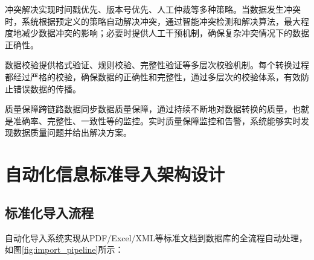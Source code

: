 冲突解决实现时间戳优先、版本号优先、人工仲裁等多种策略。当数据发生冲突时，系统根据预定义的策略自动解决冲突，通过智能冲突检测和解决算法，最大程度地减少数据冲突的影响；必要时提供人工干预机制，确保复杂冲突情况下的数据正确性。

数据校验提供格式验证、规则校验、完整性验证等多层次校验机制。每个转换过程都经过严格的校验，确保数据的正确性和完整性，通过多层次的校验体系，有效防止错误数据的传播。

质量保障跨链路数据同步数据质量保障，通过持续不断地对数据转换的质量，也就是准确率、完整性、一致性等的监控。实时质量保障监控和告警，系统能够实时发现数据质量问题并给出解决方案。

\section{自动化信息标准导入架构设计}

\subsection{标准化导入流程}

自动化导入系统实现从PDF/Excel/XML等标准文档到数据库的全流程自动处理，如图\ref{fig:import_pipeline}所示：

